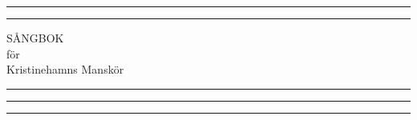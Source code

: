 \documentclass{book}
\begin{document}
\setcounter{secnumdepth}{-1}
\setlength{\footskip}{70pt}

\begin{titlepage} %
	
	\centering %
	
	
	\rule{\textwidth}{1pt} %
	
	\vspace{2pt}\vspace{-\baselineskip} %
	
	\rule{\textwidth}{0.4pt} %
	
	\vspace{0.1\textheight} %
	
	
		{\Huge S{\AA}NGBOK}\\[0.5\baselineskip] %
		{\large f{\"o}r}\\[0.5\baselineskip] %
		{\Huge Kristinehamns Mansk{\"o}r} %
	
	\vspace{0.025\textheight} %
	
	\rule{0.3\textwidth}{0.4pt} %
	
	\vspace{0.1\textheight} %
	
	
	
	\vfill %
	
	
	
	
	
	\rule{\textwidth}{0.4pt} %
	
	\vspace{2pt}\vspace{-\baselineskip} %
	
	\rule{\textwidth}{1pt} %
	
\end{titlepage}
\end{document}
